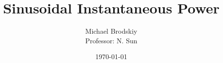 


\title{Sinusoidal Instantaneous Power}
\date{\today}
\author{Michael Brodskiy\\ \small Professor: N. Sun}



\maketitle

